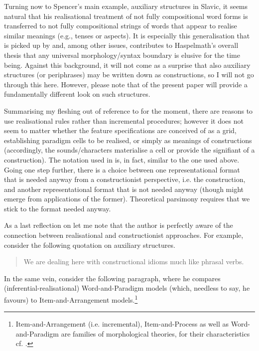 \documentclass[output=paper]{langsci/langscibook}
\begin{document}
\begin{sloppypar}
Turning now to Spencer’s main example, auxiliary structures in Slavic, it seems natural that his realisational treatment of not fully compositional word forms is transferred to not fully compositional strings of words that appear to realise similar meanings (e.g., tenses or aspects). It is especially this generalisation that is picked up by \citet[59]{Haspelmath2011} and, among other issues, contributes to Haspelmath’s overall thesis that any universal morphology/syntax boundary is elusive for the time being. Against this background, it will not come as a surprise that also auxiliary structures (or periphrases) may be written down as constructions, so I will not go through this here. However, please note that  of the present paper will provide a fundamentally different look on such structures.

Summarising my fleshing out of  reference to \citet{Spencer2001} for the moment, there are reasons to use realisational rules rather than incremental procedures; however it does not seem to matter whether the feature specifications are conceived of as a grid, establishing paradigm cells to be realised, or simply as meanings of constructions (accordingly, the sounds/characters materialise a cell or provide the signifiant of a construction). The notation used in \citet{Spencer2001} is, in fact, similar to the one used above. Going one step further, there is a choice between one representational format that is needed anyway from a constructionist perspective, i.e. the construction, and another representational format that is not needed anyway (though might emerge from applications of the former). Theoretical parsimony requires that we stick to the format needed anyway.
\end{sloppypar}

As a last reflection on \citet{Spencer2001} let me note that the author is perfectly aware of the connection between realisational and constructionist approaches. For example, consider the following quotation on auxiliary structures.

\begin{quote}
We are dealing here with constructional idioms much like phrasal verbs. \citep[283]{Spencer2001}
\end{quote}

In the same vein, consider the following paragraph, where he compares (in\-fer\-en\-tial-realisational) Word-and-Paradigm models (which, needless to say, he favours) to Item-and-Arrangement models.\footnote{Item-and-Arrangement (i.e. incremental), Item-and-Process as well as Word-and-Paradigm are families of morphological theories, for their characteristics cf. \citet{Stewart2016}.}
\end{document}

